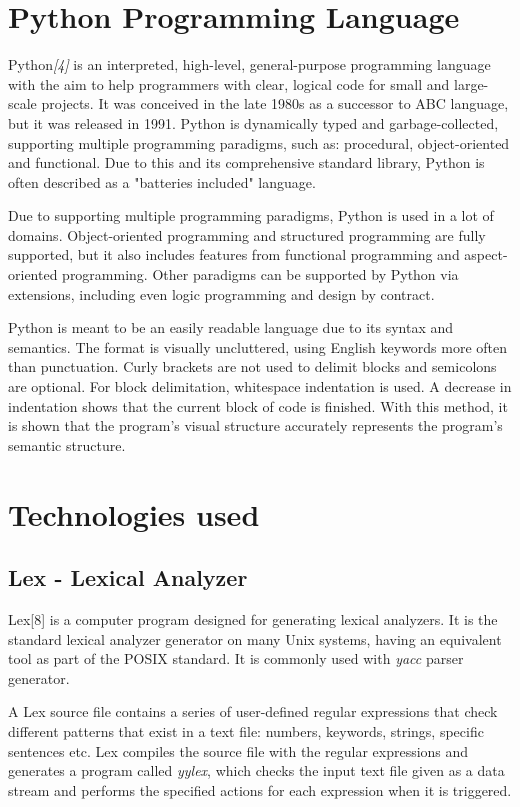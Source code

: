 \documentclass[12pt,a4paper,twoside]{report}
\begin{document}
\section{Python Programming Language}

Python{\it[4]}  is an interpreted, high-level, general-purpose programming language with the aim to help programmers with clear, logical code for small and large-scale projects. It was conceived in the late 1980s as a successor to ABC language, but it was released in 1991. Python is dynamically typed and garbage-collected, supporting multiple programming paradigms, such as: procedural, object-oriented and functional. Due to this and its comprehensive standard library, Python is often described as a "batteries included" language. 

Due to supporting multiple programming paradigms, Python is used in a lot of domains. Object-oriented programming and structured programming are fully supported, but it also includes features from functional programming and aspect-oriented programming. Other paradigms can be supported by Python via extensions, including even logic programming and design by contract. 

Python is meant to be an easily readable language due to its syntax and semantics. The format is visually uncluttered, using English keywords more often than punctuation. Curly brackets are not used to delimit blocks and semicolons are optional. For block delimitation, whitespace indentation is used. A decrease in indentation shows that the current block of code is finished. With this method, it is shown that the program's visual structure accurately represents the program's semantic structure. 

\section{Technologies used}

\subsection{Lex - Lexical Analyzer}

Lex[8] is a computer program designed for generating lexical analyzers. It is the standard lexical analyzer generator on many Unix systems, having an equivalent tool as part of the POSIX standard. It is commonly used with \textit{yacc} parser generator. 

A Lex source file contains a series of user-defined regular expressions that check different patterns that exist in a text file: numbers, keywords, strings, specific sentences etc. Lex compiles the source file with the regular expressions and generates a program called \textit{yylex}, which checks the input text file given as a data stream and performs the specified actions for each expression when it is triggered. 
\end{document}
